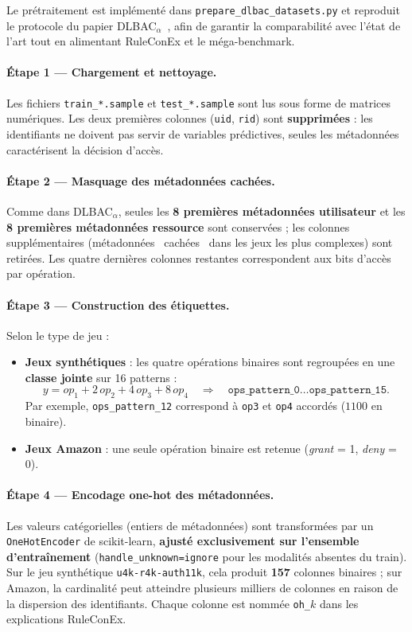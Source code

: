 \documentclass[12pt,a4paper]{article}
\begin{document}
Le pr\'etraitement est impl\'ement\'e dans \texttt{prepare\_dlbac\_datasets.py} et reproduit le protocole du papier DLBAC$_\alpha$~\cite{nobi2022}, afin de garantir la comparabilit\'e avec l'\'etat de l'art tout en alimentant RuleConEx et le m\'ega-benchmark.

\paragraph{\'Etape 1 --- Chargement et nettoyage.}
Les fichiers \texttt{train\_*.sample} et \texttt{test\_*.sample} sont lus sous forme de matrices num\'eriques. Les deux premi\`eres colonnes (\texttt{uid}, \texttt{rid}) sont \textbf{supprim\'ees} : les identifiants ne doivent pas servir de variables pr\'edictives, seules les m\'etadonn\'ees caract\'erisent la d\'ecision d'acc\`es.

\paragraph{\'Etape 2 --- Masquage des m\'etadonn\'ees cach\'ees.}
Comme dans DLBAC$_\alpha$, seules les \textbf{8 premi\`eres m\'etadonn\'ees utilisateur} et les \textbf{8 premi\`eres m\'etadonn\'ees ressource} sont conserv\'ees ; les colonnes suppl\'ementaires (m\'etadonn\'ees \og~cach\'ees~\fg{} dans les jeux les plus complexes) sont retir\'ees. Les quatre derni\`eres colonnes restantes correspondent aux bits d'acc\`es par op\'eration.

\paragraph{\'Etape 3 --- Construction des \'etiquettes.}
Selon le type de jeu :
\begin{itemize}
  \item \textbf{Jeux synth\'etiques} : les quatre op\'erations binaires sont regroup\'ees en une \textbf{classe jointe} sur 16 patterns :
  \[
    y = op_1 + 2\,op_2 + 4\,op_3 + 8\,op_4
    \quad\Rightarrow\quad
    \texttt{ops\_pattern\_0} \ldots \texttt{ops\_pattern\_15}.
  \]
  Par exemple, \texttt{ops\_pattern\_12} correspond \`a \texttt{op3} et \texttt{op4} accord\'es ($1100$ en binaire).
  \item \textbf{Jeux Amazon} : une seule op\'eration binaire est retenue (\textit{grant} = 1, \textit{deny} = 0).
\end{itemize}

\paragraph{\'Etape 4 --- Encodage one-hot des m\'etadonn\'ees.}
Les valeurs cat\'egorielles (entiers de m\'etadonn\'ees) sont transform\'ees par un \texttt{OneHotEncoder} de scikit-learn, \textbf{ajust\'e exclusivement sur l'ensemble d'entra\^inement} (\texttt{handle\_unknown=ignore} pour les modalit\'es absentes du train). Sur le jeu synth\'etique \texttt{u4k-r4k-auth11k}, cela produit \textbf{157} colonnes binaires ; sur Amazon, la cardinalit\'e peut atteindre plusieurs milliers de colonnes en raison de la dispersion des identifiants. Chaque colonne est nomm\'ee \texttt{oh\_$k$} dans les explications RuleConEx.
\end{document}

